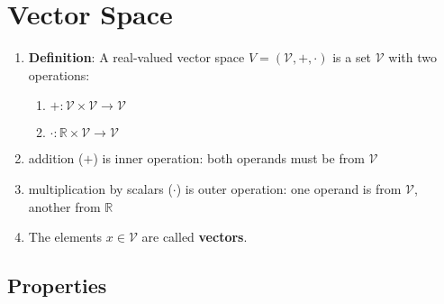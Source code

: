 \section{Vector Space}

\begin{enumerate}
    \item \textbf{Definition}: A real-valued vector space $V = (\mathcal{V}, +, \cdot)$ is a set $\mathcal{V}$ with two operations:
    \begin{enumerate}
        \item[] $+ :  \mathcal{V} \times \mathcal{V} \to \mathcal{V}$

        \item[] $\cdot: \mathbb{R} \times \mathcal{V} \to \mathcal{V}$ 
    \end{enumerate}


    \item addition ($+$) is inner operation: both operands must be from $\mathcal{V}$

    \item multiplication by scalars ($\cdot$) is outer operation: one operand is from $\mathcal{V}$, another from $\mathbb{R}$

    \item The elements $x \in \mathcal{V}$ are called \textbf{vectors}.
\end{enumerate}


\subsection{Properties}


